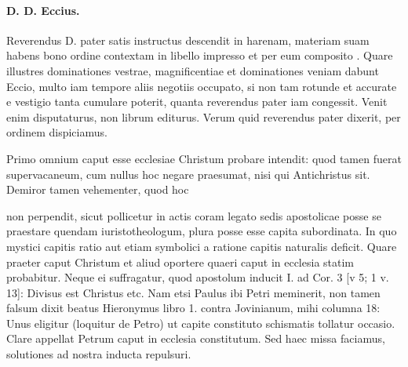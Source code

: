 \paragraph*{D. D. Eccius.}

Reverendus D. pater satis instructus descendit in harenam, materiam suam habens bono ordine contextam in libello impresso et per eum composito \marginpar{\small[260]}. Quare illustres dominationes vestrae, magnificentiae et dominationes veniam dabunt Eccio, multo iam tempore aliis negotiis occupato, si non tam rotunde et accurate e vestigio tanta cumulare poterit, quanta reverendus pater iam congessit. Venit enim disputaturus, non librum editurus. Verum quid reverendus pater dixerit, per ordinem dispiciamus.

Primo omnium caput esse ecclesiae Christum probare intendit: quod tamen fuerat supervacaneum, cum nullus hoc negare praesumat, nisi qui Antichristus sit. Demiror tamen vehementer, quod hoc

non perpendit, sicut pollicetur in actis coram legato sedis apostolicae posse se praestare quendam iuristotheologum, plura posse esse capita subordinata. In quo mystici capitis ratio aut etiam symbolici a ratione capitis naturalis deficit. Quare praeter caput Christum et aliud oportere quaeri caput in ecclesia statim probabitur. Neque ei suffragatur, quod apostolum inducit I. ad Cor. 3 [v 5; 1 v. 13]: Divisus est Christus etc. Nam etsi Paulus ibi Petri meminerit, non tamen falsum dixit beatus Hieronymus libro 1. contra Jovinianum, mihi columna 18: Unus eligitur (loquitur de Petro) ut capite constituto schismatis tollatur occasio. Clare appellat Petrum caput in ecclesia constitutum. Sed haec missa faciamus, solutiones ad nostra inducta repulsuri.

